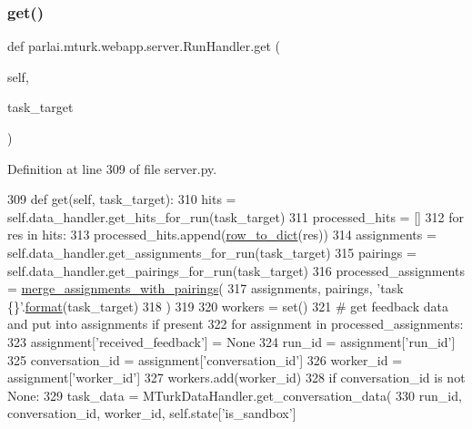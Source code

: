 \subsubsection{\texorpdfstring{get()}{get()}}
{\footnotesize\ttfamily def parlai.\+mturk.\+webapp.\+server.\+Run\+Handler.\+get (\begin{DoxyParamCaption}\item[{}]{self,  }\item[{}]{task\+\_\+target }\end{DoxyParamCaption})}



Definition at line 309 of file server.\+py.


\begin{DoxyCode}
309     \textcolor{keyword}{def }get(self, task\_target):
310         hits = self.data\_handler.get\_hits\_for\_run(task\_target)
311         processed\_hits = []
312         \textcolor{keywordflow}{for} res \textcolor{keywordflow}{in} hits:
313             processed\_hits.append(\hyperlink{namespaceparlai_1_1mturk_1_1webapp_1_1server_a92be47964fa33a4b6a14d4069d091c7d}{row\_to\_dict}(res))
314         assignments = self.data\_handler.get\_assignments\_for\_run(task\_target)
315         pairings = self.data\_handler.get\_pairings\_for\_run(task\_target)
316         processed\_assignments = \hyperlink{namespaceparlai_1_1mturk_1_1webapp_1_1server_abe6ddbf97d0e5c26315fa927ed076489}{merge\_assignments\_with\_pairings}(
317             assignments, pairings, \textcolor{stringliteral}{'task \{\}'}.\hyperlink{namespaceparlai_1_1chat__service_1_1services_1_1messenger_1_1shared__utils_a32e2e2022b824fbaf80c747160b52a76}{format}(task\_target)
318         )
319 
320         workers = set()
321         \textcolor{comment}{# get feedback data and put into assignments if present}
322         \textcolor{keywordflow}{for} assignment \textcolor{keywordflow}{in} processed\_assignments:
323             assignment[\textcolor{stringliteral}{'received\_feedback'}] = \textcolor{keywordtype}{None}
324             run\_id = assignment[\textcolor{stringliteral}{'run\_id'}]
325             conversation\_id = assignment[\textcolor{stringliteral}{'conversation\_id'}]
326             worker\_id = assignment[\textcolor{stringliteral}{'worker\_id'}]
327             workers.add(worker\_id)
328             \textcolor{keywordflow}{if} conversation\_id \textcolor{keywordflow}{is} \textcolor{keywordflow}{not} \textcolor{keywordtype}{None}:
329                 task\_data = MTurkDataHandler.get\_conversation\_data(
330                     run\_id, conversation\_id, worker\_id, self.state[\textcolor{stringliteral}{'is\_sandbox'}]

\end{DoxyCode}

